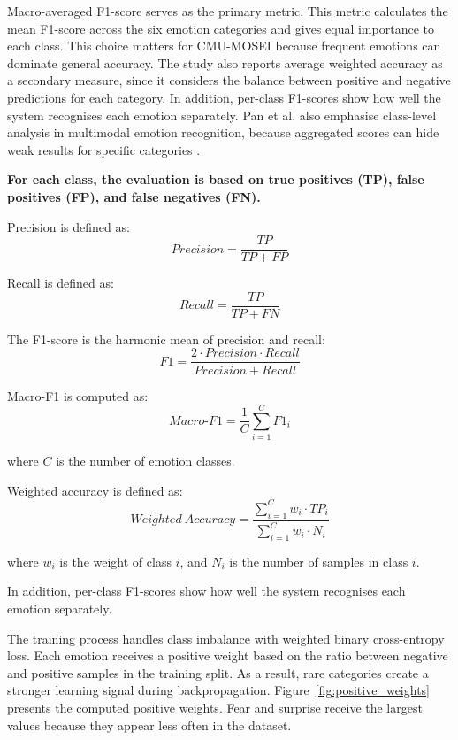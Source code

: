 Macro-averaged F1-score serves as the primary metric. This metric calculates the mean F1-score across the six emotion categories and gives equal importance to each class. This choice matters for CMU-MOSEI because frequent emotions can dominate general accuracy. The study also reports average weighted accuracy as a secondary measure, since it considers the balance between positive and negative predictions for each category. In addition, per-class F1-scores show how well the system recognises each emotion separately. Pan et al. also emphasise class-level analysis in multimodal emotion recognition, because aggregated scores can hide weak results for specific categories \cite{pan2023multimodal}.

\textbf{For each class, the evaluation is based on true positives (TP), false positives (FP), and false negatives (FN).}

Precision is defined as:
\begin{equation}
Precision = \frac{TP}{TP + FP}
\end{equation}

Recall is defined as:
\begin{equation}
Recall = \frac{TP}{TP + FN}
\end{equation}

The F1-score is the harmonic mean of precision and recall:
\begin{equation}
F1 = \frac{2 \cdot Precision \cdot Recall}{Precision + Recall}
\end{equation}

Macro-F1 is computed as:
\begin{equation}
Macro\text{-}F1 = \frac{1}{C} \sum_{i=1}^{C} F1_i
\end{equation}

where $C$ is the number of emotion classes.

Weighted accuracy is defined as:
\begin{equation}
Weighted\ Accuracy = \frac{\sum_{i=1}^{C} w_i \cdot TP_i}{\sum_{i=1}^{C} w_i \cdot N_i}
\end{equation}

where $w_i$ is the weight of class $i$, and $N_i$ is the number of samples in class $i$.

In addition, per-class F1-scores show how well the system recognises each emotion separately.

The training process handles class imbalance with weighted binary cross-entropy loss. Each emotion receives a positive weight based on the ratio between negative and positive samples in the training split. As a result, rare categories create a stronger learning signal during backpropagation. Figure~\ref{fig:positive_weights} presents the computed positive weights. Fear and surprise receive the largest values because they appear less often in the dataset.

